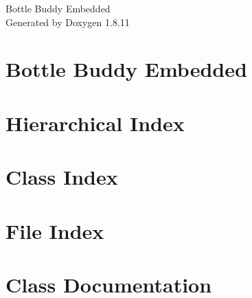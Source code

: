 \documentclass[twoside]{book}
\newcommand{\+}{\discretionary{\mbox{\scriptsize$\hookleftarrow$}}{}{}}
\newcommand{\clearemptydoublepage}{%
  \newpage{\pagestyle{empty}\cleardoublepage}%
}
\begin{document}
\hypersetup{pageanchor=false,
             bookmarksnumbered=true,
             pdfencoding=unicode
            }
\begin{titlepage}
\vspace*{7cm}
\begin{center}%
{\Large Bottle Buddy Embedded }\\
\vspace*{1cm}
{\large Generated by Doxygen 1.8.11}\\
\end{center}
\end{titlepage}
\clearemptydoublepage
\tableofcontents
\clearemptydoublepage
{}
\hypersetup{pageanchor=true}

\chapter{Bottle Buddy Embedded}
\label{md__home_travis_build_BottleBuddy_bottle-buddy-embedded_README}
\hypertarget{md__home_travis_build_BottleBuddy_bottle-buddy-embedded_README}{}

\chapter{Hierarchical Index}

\chapter{Class Index}

\chapter{File Index}

\chapter{Class Documentation}











\end{document}
